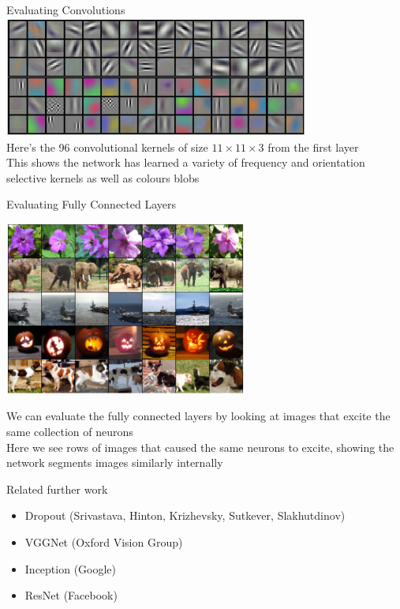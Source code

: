 \documentclass{beamer}
\begin{document}
\begin{frame}{Evaluating Convolutions}
	\includegraphics[width=10cm]{filters}\\
	Here's the 96 convolutional kernels of size $11\times 11\times 3$ from the first layer\\
	This shows the network has learned a variety of frequency and orientation selective kernels as well as colours blobs
\end{frame}

\begin{frame}{Evaluating Fully Connected Layers}
	\begin{center}
		\includegraphics[width=8cm]{similar}\\
	\end{center}
	
	We can evaluate the fully connected layers by looking at images that excite the same collection of neurons\\
	Here we see rows of images that caused the same neurons to excite, showing the network segments images similarly internally
\end{frame}


\begin{frame}{Related further work}
	\begin{itemize}
		\item Dropout (Srivastava, Hinton, Krizhevsky, Sutkever, Slakhutdinov)
		\item VGGNet (Oxford Vision Group)
		\item Inception (Google)
		\item ResNet (Facebook)
	\end{itemize}
\end{frame}
\end{document}
